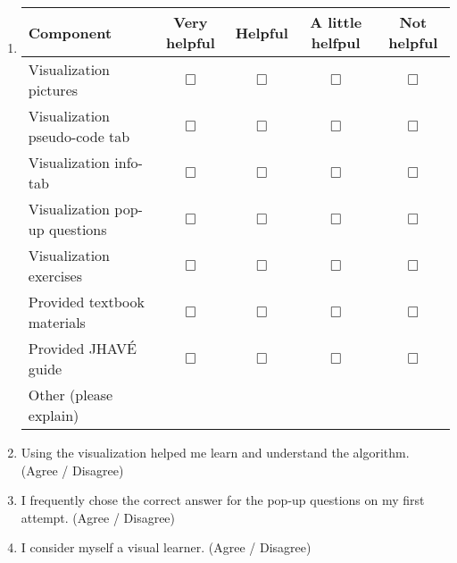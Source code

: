 \documentclass[letter]{article}
\begin{document}
\begin{enumerate}
\item
\begin{tabular}{| l | c | c | c | c |}
\hline
\textbf{Component} & \textbf{Very helpful} & \textbf{Helpful} & \textbf{A little helfpul} & \textbf{Not helpful} \\
\hline
Visualization pictures & $\Box$ & $\Box$ & $\Box$ & $\Box$ \\
\hline
Visualization pseudo-code tab & $\Box$ & $\Box$ & $\Box$ & $\Box$ \\
\hline
Visualization info-tab & $\Box$ & $\Box$ & $\Box$ & $\Box$ \\
\hline
Visualization pop-up questions & $\Box$ & $\Box$ & $\Box$ & $\Box$ \\
\hline
Visualization exercises & $\Box$ & $\Box$ & $\Box$ & $\Box$ \\
\hline
Provided textbook materials & $\Box$ & $\Box$ & $\Box$ & $\Box$ \\
\hline
Provided JHAVÉ guide & $\Box$ & $\Box$ & $\Box$ & $\Box$ \\
\hline
Other (please explain) &&&&\\
\hline
\end{tabular}

\addtocounter{enumi}{7}

\item Using the visualization helped me learn and understand the algorithm.
(Agree / Disagree)

\item I frequently chose  the correct answer for the pop-up questions on my first attempt.
(Agree / Disagree)

\item I consider myself a visual learner.
(Agree / Disagree)


\begin{comment}
\section*{Question Questions}

\item I frequently guessed on the pop-up questions.
(Agree / Disagree)

\item The questions were ambiguous or confusing.
(Agree / Disagree)


\end{comment}
\end{enumerate}
\end{document}
